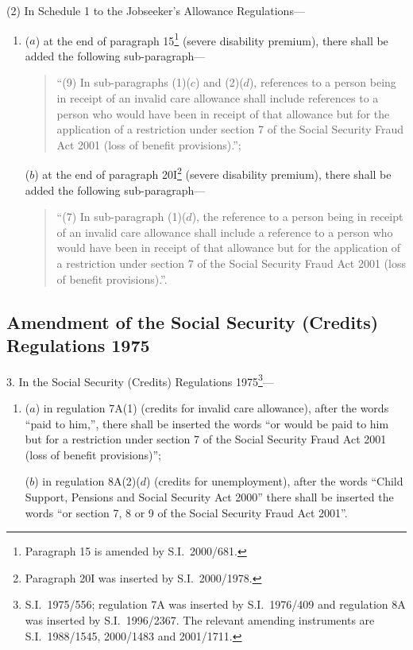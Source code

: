 \documentclass[12pt,a4paper]{article}
\begin{document}
(2) In Schedule 1 to the Jobseeker’s Allowance Regulations—
\begin{enumerate}\item[]
($a$) at the end of paragraph 15\footnote{Paragraph 15 is amended by S.I.\ 2000/681.} (severe disability premium), there shall be added the following sub-paragraph—
\begin{quotation}
“(9) In sub-paragraphs (1)($c$)  and (2)($d$), references to a person being in receipt of an invalid care allowance shall include references to a person who would have been in receipt of that allowance but for the application of a restriction under section 7 of the Social Security Fraud Act 2001 (loss of benefit provisions).”;
\end{quotation}

($b$) at the end of paragraph 20I\footnote{Paragraph 20I was inserted by S.I.\ 2000/1978.} (severe disability premium), there shall be added the following sub-paragraph—
\begin{quotation}
“(7) In sub-paragraph (1)($d$), the reference to a person being in receipt of an invalid care allowance shall include a reference to a person who would have been in receipt of that allowance but for the application of a restriction under section 7 of the Social Security Fraud Act 2001 (loss of benefit provisions).”.
\end{quotation}
\end{enumerate}

\subsection[3. Amendment of the Social Security (Credits) Regulations 1975]{Amendment of the Social Security (Credits) Regulations 1975}

3.  In the Social Security (Credits) Regulations 1975\footnote{S.I.\ 1975/556; regulation 7A was inserted by S.I.\ 1976/409 and regulation 8A was inserted by S.I.\ 1996/2367. The relevant amending instruments are S.I.\ 1988/1545, 2000/1483 and 2001/1711.}—
\begin{enumerate}\item[]
($a$) in regulation 7A(1) (credits for invalid care allowance), after the words “paid to him,”, there shall be inserted the words “or would be paid to him but for a restriction under section 7 of the Social Security Fraud Act 2001 (loss of benefit provisions)”;

($b$) in regulation 8A(2)($d$)  (credits for unemployment), after the words “Child Support, Pensions and Social Security Act 2000” there shall be inserted the words “or section 7, 8 or 9 of the Social Security Fraud Act 2001”.
\end{enumerate}
\end{document}
